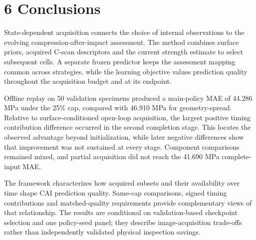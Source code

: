 \section{6 Conclusions}\label{conclusions}

State-dependent acquisition connects the choice of internal observations to the evolving compression-after-impact assessment. The method combines surface priors, acquired C-scan descriptors and the current strength estimate to select subsequent cells. A separate frozen predictor keeps the assessment mapping common across strategies, while the learning objective values prediction quality throughout the acquisition budget and at its endpoint.

Offline replay on 50 validation specimens produced a main-policy MAE of 44.286 MPa under the 25\% cap, compared with 46.910 MPa for geometry-spread. Relative to surface-conditioned open-loop acquisition, the largest positive timing contribution difference occurred in the second completion stage. This locates the observed advantage beyond initialization, while later negative differences show that improvement was not sustained at every stage. Component comparisons remained mixed, and partial acquisition did not reach the 41.690 MPa complete-input MAE.

The framework characterizes how acquired subsets and their availability over time shape CAI prediction quality. Same-cap comparisons, signed timing contributions and matched-quality requirements provide complementary views of that relationship. The results are conditional on validation-based checkpoint selection and one policy-seed panel; they describe image-acquisition trade-offs rather than independently validated physical inspection savings.
